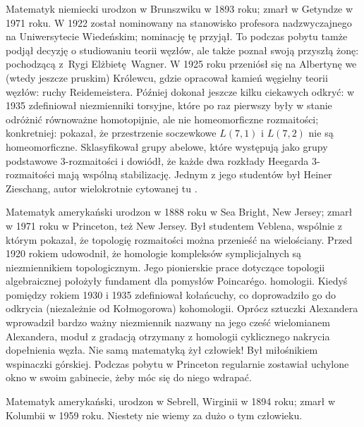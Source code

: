 \begin{remark}
    Matematyk niemiecki urodzon w Brunszwiku w 1893 roku; zmarł w Getyndze w 1971 roku.
    W 1922 został nominowany na stanowisko profesora nadzwyczajnego na Uniwersytecie Wiedeńskim; nominację tę przyjął.
    To podczas pobytu tamże podjął decyzję o studiowaniu teorii węzłów, ale także poznał swoją przyszłą żonę: pochodzącą z~Rygi Elżbietę Wagner.
    W 1925 roku przeniósł się na Albertynę we (wtedy jeszcze pruskim) Królewcu, gdzie opracował kamień węgielny teorii węzłów: ruchy Reidemeistera.
    Później dokonał jeszcze kilku ciekawych odkryć: w 1935 zdefiniował niezmienniki torsyjne, które po raz pierwszy były w stanie odróżnić równoważne homotopijnie, ale nie homeomorficzne rozmaitości; konkretniej: pokazał, że przestrzenie soczewkowe $L(7, 1)$ i $L(7, 2)$ nie są homeomorficzne.
    Sklasyfikował grupy abelowe, które występują jako grupy podstawowe 3-rozmaitości i dowiódł, że każde dwa rozkłady Heegarda 3-rozmaitości mają wspólną stabilizację.
    Jednym z jego studentów był Heiner Zieschang, autor wielokrotnie cytowanej tu \cite{burde2014}.
\end{remark}

\begin{remark}
    Matematyk amerykański urodzon w 1888 roku w Sea Bright, New Jersey; zmarł w 1971 roku w Princeton, też New Jersey.
    Był studentem Veblena, wspólnie z którym pokazał, że topologię rozmaitości można przenieść na wielościany.
    Przed 1920 rokiem udowodnił, że homologie kompleksów symplicjalnych są niezmiennikiem topologicznym.
    Jego pionierskie prace dotyczące topologii algebraicznej położyły fundament dla pomysłów Poincarégo.
    homologii.
    Kiedyś pomiędzy rokiem 1930 i 1935 zdefiniował kołańcuchy, co doprowadziło go do odkrycia (niezależnie od Kołmogorowa) kohomologii.
    Oprócz sztuczki Alexandera wprowadził bardzo ważny niezmiennik nazwany na jego cześć wielomianem Alexandera, moduł z gradacją otrzymany z homologii cyklicznego nakrycia dopełnienia węzła.
    Nie samą matematyką żył człowiek!
    Był miłośnikiem wspinaczki górskiej.
    Podczas pobytu w Princeton regularnie zostawiał uchylone okno w swoim gabinecie, żeby móc się do niego wdrapać.
\end{remark}

\begin{remark}
    Matematyk amerykański, urodzon w Sebrell, Wirginii w 1894 roku; zmarł w Kolumbii w 1959 roku.
    Niestety nie wiemy za dużo o tym człowieku.
\end{remark}

